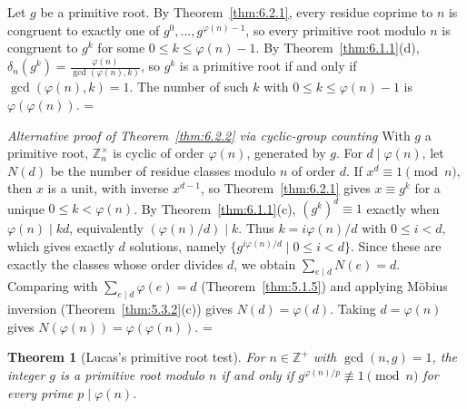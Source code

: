 \documentclass[11pt]{article}
\makeatletter
\theoremstyle{ntstyle}
\newtheorem{theorem}{Theorem}[subsection]
\let\nt@closedisplay\]
\def\nt@guardedclose{\@ifnextchar\par{\nt@closeafterpar}{\@ifnextchar\end{\postdisplaypenalty\@M\nt@closedisplay}{\nt@closedisplay}}}
\def\nt@closeafterpar\par{\@ifnextchar\par{\nt@closeafterpar}{\@ifnextchar\end{\postdisplaypenalty\@M\nt@closedisplay\par}{\nt@closedisplay\par}}}
\renewenvironment{proof}[1][\proofname]{\par
  \pushQED{\qed}\normalfont\topsep\medskipamount\edef\nt@afterproof{\@endparpenalty=\the\@endparpenalty\relax}\@beginparpenalty\@M\@endparpenalty\@M\let\]\nt@guardedclose\trivlist\item[]\textit{#1\@addpunct{.}} \ignorespaces}{\ifvmode\addpenalty\@M\fi\popQED\nt@afterproof\endtrivlist\@endpefalse}
\newenvironment{altproof}[1][\proofname]{\begin{proof}[#1]}{\end{proof}}
\newcommand{\ZmodUnits}[1]{\mathbb{Z}_{#1}^{\times}}
\makeatother
\begin{document}
\begin{proof} Let $g$ be a primitive root. By Theorem~\ref{thm:6.2.1}, every residue coprime to $n$
is congruent to exactly one of
	$g^{0}, \ldots, g^{\varphi(n) - 1}$, so every primitive root modulo
	$n$ is congruent to $g^{k}$ for some $0 \le k \le \varphi(n) - 1$. By
	Theorem~\ref{thm:6.1.1}(d), $\delta_n(g^{k}) =
		\frac{\varphi(n)}{\gcd(\varphi(n), k)}$,
	so $g^{k}$ is a primitive root if and only if $\gcd(\varphi(n), k) =
		1$. The number of such $k$ with $0 \le k \le \varphi(n) - 1$ is
	$\varphi(\varphi(n))$.
\end{proof}
\begin{altproof}[Alternative proof of Theorem~\ref{thm:6.2.2} via cyclic-group counting]
	With $g$ a primitive root, $\ZmodUnits{n}$ is cyclic of order
	$\varphi(n)$, generated by $g$. For $d \mid \varphi(n)$, let $N(d)$
	be the number of residue classes modulo $n$ of order $d$. If
	$x^d\equiv1\pmod{n}$, then $x$ is a unit, with inverse $x^{d-1}$, so
	Theorem~\ref{thm:6.2.1} gives $x\equiv g^k$ for a unique
	$0\le k<\varphi(n)$. By Theorem~\ref{thm:6.1.1}(c),
	$(g^k)^d\equiv1$ exactly when $\varphi(n)\mid kd$, equivalently
	$(\varphi(n)/d)\mid k$. Thus $k=i\varphi(n)/d$ with $0\le i<d$,
	which gives exactly $d$ solutions, namely
	$\{g^{i\varphi(n)/d}\mid0\le i<d\}$. Since these are exactly the
	classes whose order divides $d$, we obtain $\sum_{e \mid d} N(e) = d$. Comparing with
	$\sum_{e \mid d}\varphi(e) = d$ (Theorem~\ref{thm:5.1.5}) and applying M{\"o}bius inversion
	(Theorem~\ref{thm:5.3.2}(c)) gives $N(d) = \varphi(d)$. Taking $d = \varphi(n)$ gives $N(\varphi(n)) =
		\varphi(\varphi(n))$.
\end{altproof}

\begin{theorem}[Lucas's primitive root test]\label{thm:6.2.3} For $n
		\in \mathbb{Z}^+$ with $\gcd(n, g) = 1$, the integer $g$ is a primitive root
	modulo $n$ if and only if $g^{\varphi(n)/p} \not\equiv 1 \pmod{n}$ for
	every prime $p \mid \varphi(n)$.
\end{theorem}
\end{document}
